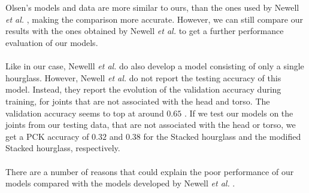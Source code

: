 \documentclass[./main.tex]{subfiles}
\begin{document}
\\
\\
Olsen's models and data are more similar to ours, than the ones used by Newell \textit{et al.} \cite{Newell}, making the comparison more accurate. However, we can still compare our results with the ones obtained by Newell \textit{et al.} \cite{Newell} to get a further performance evaluation of our models.
\\
\\
Like in our case, Newelll \textit{et al.} do also develop a model consisting of only a single hourglass. However, Newell \textit{et al.} do not report the testing accuracy of this model. Instead, they report the evolution of the validation accuracy during training, for joints that are not associated with the head and torso. The validation accuracy seems to top at around $0.65$ \cite{Newell}. If we test our models on the joints from our testing data, that are not associated with the head or torso, we get a PCK accuracy of $0.32$ and $0.38$ for the Stacked hourglass and the modified Stacked hourglass, respectively.
\\
\\
There are a number of reasons that could explain the poor performance of our models compared with the models developed by Newell \textit{et al.} \cite{Newell}. 
\end{document}
